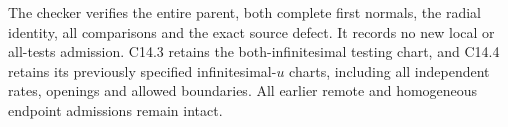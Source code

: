 The checker verifies the entire parent, both complete first normals,
the radial identity, all comparisons and the exact source defect.
It records no new local or all-tests admission. C14.3 retains the
both-infinitesimal testing chart, and C14.4 retains its previously
specified infinitesimal-$u$ charts, including all independent rates,
openings and allowed boundaries. All earlier remote and homogeneous
endpoint admissions remain intact.
